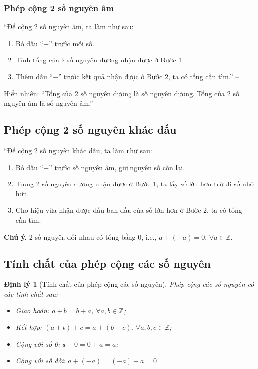 \documentclass[oneside]{book}
\numberwithin{equation}{section}
\newtheorem{dinhly}{Định lý}[section]
\begin{document}
\subsubsection{Phép cộng 2 số nguyên âm}
``Để cộng 2 số nguyên âm, ta làm như sau:
\begin{enumerate}
	\item Bỏ dấu ``$-$'' trước mỗi số.
	\item Tính tổng của 2 số nguyên dương nhận được ở Bước 1.
	\item Thêm dấu ``$-$'' trước kết quả nhận được ở Bước 2, ta có tổng cần tìm.'' -- \cite[p. 71]{Thai_Anh_Dat_Ha_Loan_Nam_Quang_Toan_6_tap_1}
\end{enumerate}
Hiển nhiên: ``Tổng của 2 số nguyên dương là số nguyên dương. Tổng của 2 số nguyên âm là số nguyên âm.'' -- \cite[p. 71]{Thai_Anh_Dat_Ha_Loan_Nam_Quang_Toan_6_tap_1}

\subsection{Phép cộng 2 số nguyên khác dấu}
``Để cộng 2 số nguyên khác dấu, ta làm như sau:
\begin{enumerate}
	\item Bỏ dấu ``$-$'' trước số nguyên âm, giữ nguyên số còn lại.
	\item Trong 2 số nguyên dương nhận được ở Bước 1, ta lấy số lớn hơn trừ đi số nhỏ hơn.
	\item Cho hiệu vừa nhận được dấu ban đầu của số lớn hơn ở Bước 2, ta có tổng cần tìm.
\end{enumerate}
\textbf{Chú ý.} 2 số nguyên đối nhau có tổng bằng 0, i.e., $a + (-a) = 0$, $\forall a\in\mathbb{Z}$.

\subsection{Tính chất của phép cộng các số nguyên}

\begin{dinhly}[Tính chất của phép cộng các số nguyên]
	Phép cộng các số nguyên có các tính chất sau:
	\begin{itemize}
		\item Giao hoán: $a + b = b + a$, $\forall a,b\in\mathbb{Z}$;
		\item Kết hợp: $(a + b) + c = a + (b + c)$, $\forall a,b,c\in\mathbb{Z}$;
		\item Cộng với số 0: $a + 0 = 0 + a = a$;
		\item Cộng với số đối: $a + (-a) = (-a) + a = 0$.
	\end{itemize}
\end{dinhly}
\end{document}
